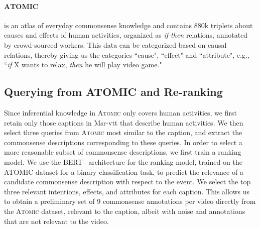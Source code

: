 \paragraph{A\textsc{TOMIC}}\cite{sap2018atomic} is an atlas of everyday commonsense knowledge and contains 880k triplets about causes and effects of human activities, organized as \textit{if-then} relations, annotated by crowd-sourced workers.
This data can be categorized based on causal relations, thereby giving us the categories ``cause", ``effect" and ``attribute", e.g., ``\textit{if} X wants to relax, \textit{then} he will play video game."
    
    \subsection{Querying from ATOMIC and Re-ranking}
    
    
    Since inferential knowledge in A\textsc{tomic} only covers human activities, we first retain only those captions in {M{sr-vtt}} that describe human activities.
    We then select three queries from A\textsc{tomic} most similar to the caption, and extract the commonsense descriptions corresponding to these queries.
    In order to select a more reasonable subset of commonsense descriptions, we first train a ranking model.
    We use the BERT~\cite{devlin2018bert} architecture for the ranking model, trained on the ATOMIC dataset for a binary classification task, to predict the relevance of a candidate commonsense description with respect to the event.
    We select the top three relevant intentions, effects, and attributes for each caption.
    This allows us to obtain a preliminary set of 9 commonsense annotations per video directly from the A\textsc{tomic} dataset, relevant to the caption, albeit with noise and annotations that are not relevant to the video.


